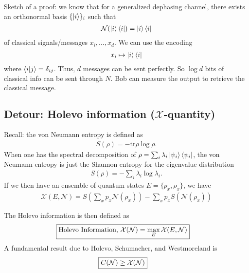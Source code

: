 \documentclass[../../note.tex]{subfiles}
\begin{document}
Sketch of a proof: we know that for a generalized dephasing channel, there exists an orthonormal basis $\{\ket{i}\}_i$ such that 
\begin{align}
    \mathcal{N}(\ket{i}\bra{i}) = \ket{i}\bra{i}
\end{align}
of classical signals/messages $x_i, \dots, x_d$. We can use the encoding
\begin{align}
    x_i \mapsto \ket{i}\bra{i}
\end{align}
where $\braket{i|j}=\delta_{ij}$. Thus, $d$ messages can be sent perfectly. So $\log{d}$ bits of classical info can be sent through $N$. Bob can measure the output to retrieve the classical message. 

\subsection{Detour: Holevo information ($\mathcal{X}$-quantity)}
Recall: the von Neumann entropy is defined as 
\begin{align}
    S(\rho) = - \text{tr} \rho \log \rho.
\end{align}
When one has the spectral decomposition of $\rho=\sum_i \lambda_i \ket{\psi_i}\bra{\psi_i}$, the von Neumann entropy is just the Shannon entropy for the eigenvalue distribution
\begin{align}
    S(\rho) = -\sum_i \lambda_i \log \lambda_i.
\end{align}
If we then have an ensemble of quantum states $E=\{p_x, \rho_x\}$, we have
\begin{align}
    \mathcal{X}(E,\mathcal{N})=S(\sum_x p_x \mathcal{N}(\rho_x)) - \sum_x p_x S(\mathcal{N}(\rho_x))
\end{align}

The Holevo information is then defined as
\begin{align}
 \Aboxed{\text{Holevo Information, } \mathcal{X}(\mathcal{N})=\max_{E} \mathcal{X}(E,\mathcal{N})}
\end{align}
A fundamental result due to Holevo, Schumacher, and Westmoreland is 
\begin{align}
    \Aboxed{C(\mathcal{N})\geq \mathcal{X}(\mathcal{N})}
\end{align}
\end{document}
